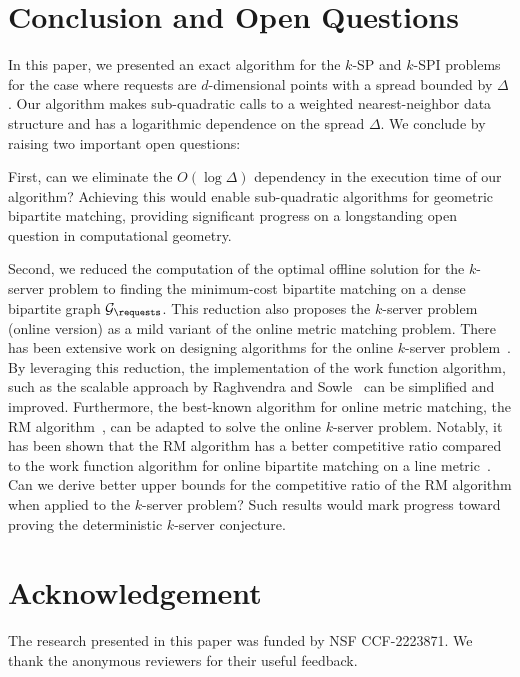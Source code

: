 \documentclass[11pt,onecolumn]{article}
\begin{document}
\section{Conclusion and Open Questions}\label{sec:conclusion}
In this paper, we presented an exact algorithm for the $k$-SP and $k$-SPI problems for the case where requests are $d$-dimensional points with a spread bounded by $\Delta$. Our algorithm makes sub-quadratic calls to a weighted nearest-neighbor data structure and has a logarithmic dependence on the spread $\Delta$.  We conclude by raising two important open questions:

First, can we eliminate the $O(\log \Delta)$ dependency in the execution time of our algorithm? Achieving this would enable sub-quadratic algorithms for geometric bipartite matching, providing significant progress on a longstanding open question in computational geometry. 

Second, we reduced the computation of the optimal offline solution for the $k$-server problem to finding the minimum-cost bipartite matching on a dense bipartite graph $\mathcal{G}_\requests$. This reduction also proposes the $k$-server problem (online version) as a mild variant of the online metric matching problem. There has been extensive work on designing algorithms for the online $k$-server problem~\cite{bubeck2018k,S7,S16,S3, jamesLee2018, S14, raghvendra2022scalable, rudec2013fast}. By leveraging this reduction, the implementation of the work function algorithm, such as the scalable approach by Raghvendra and Sowle~\cite{raghvendra2022scalable} can be simplified and improved. Furthermore, the best-known algorithm for online metric matching, the RM algorithm~\cite{my_focs_paper, raghvendra2016robust}, can be adapted to solve the online $k$-server problem. Notably, it has been shown that the RM algorithm has a better competitive ratio compared to the work function algorithm for online bipartite matching on a line metric~\cite{s_socg18}. Can we derive better upper bounds for the competitive ratio of the RM algorithm when applied to the $k$-server problem? Such results would mark progress toward proving the deterministic $k$-server conjecture. 

\section*{Acknowledgement}
The research presented in this paper was funded by NSF CCF-2223871. We thank the anonymous reviewers for their useful feedback.




\newpage
\appendix








\end{document}
